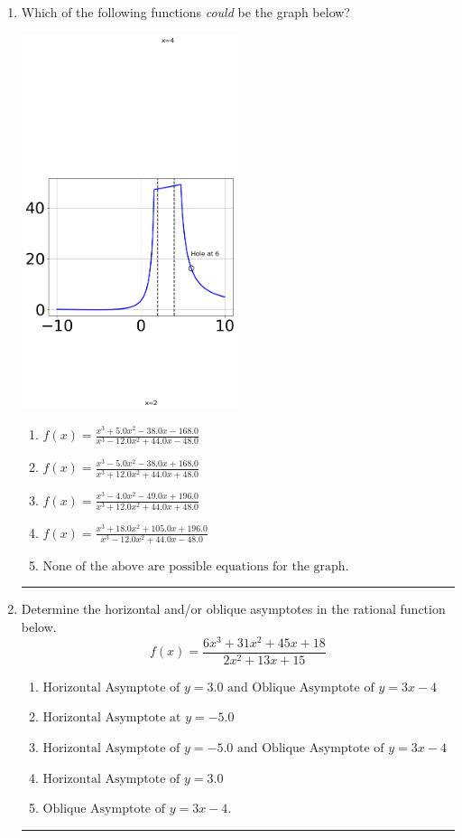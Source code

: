 \documentclass[14pt]{extbook}
\newcommand{\litem}[1]{\item#1\hspace*{-1cm}\rule{\textwidth}{0.4pt}}
\begin{document}
\begin{enumerate}
{\begin{enumerate}[label=\Alph*.]
\end{enumerate} }
\litem{
Which of the following functions \textit{could} be the graph below?
\begin{center}
    \includegraphics[width=0.5\textwidth]{../Figures/identifyGraphOfRationalFunctionA.png}
\end{center}
\begin{enumerate}[label=\Alph*.]
\item \( f(x)=\frac{x^{3} +5.0 x^{2} -38.0 x -168.0}{x^{3} -12.0 x^{2} +44.0 x -48.0} \)
\item \( f(x)=\frac{x^{3} -5.0 x^{2} -38.0 x + 168.0}{x^{3} +12.0 x^{2} +44.0 x + 48.0} \)
\item \( f(x)=\frac{x^{3} -4.0 x^{2} -49.0 x + 196.0}{x^{3} +12.0 x^{2} +44.0 x + 48.0} \)
\item \( f(x)=\frac{x^{3} +18.0 x^{2} +105.0 x + 196.0}{x^{3} -12.0 x^{2} +44.0 x -48.0} \)
\item \( \text{None of the above are possible equations for the graph.} \)

\end{enumerate} }
\litem{
Determine the horizontal and/or oblique asymptotes in the rational function below.\[ f(x) = \frac{6x^{3} +31 x^{2} +45 x + 18}{2x^{2} +13 x + 15} \]\begin{enumerate}[label=\Alph*.]
\item \( \text{Horizontal Asymptote of } y = 3.0 \text{ and Oblique Asymptote of } y = 3x -4 \)
\item \( \text{Horizontal Asymptote at } y = -5.0 \)
\item \( \text{Horizontal Asymptote of } y = -5.0 \text{ and Oblique Asymptote of } y = 3x -4 \)
\item \( \text{Horizontal Asymptote of } y = 3.0  \)
\item \( \text{Oblique Asymptote of } y = 3x -4. \)

\end{enumerate} }
\end{enumerate}
\end{document}
